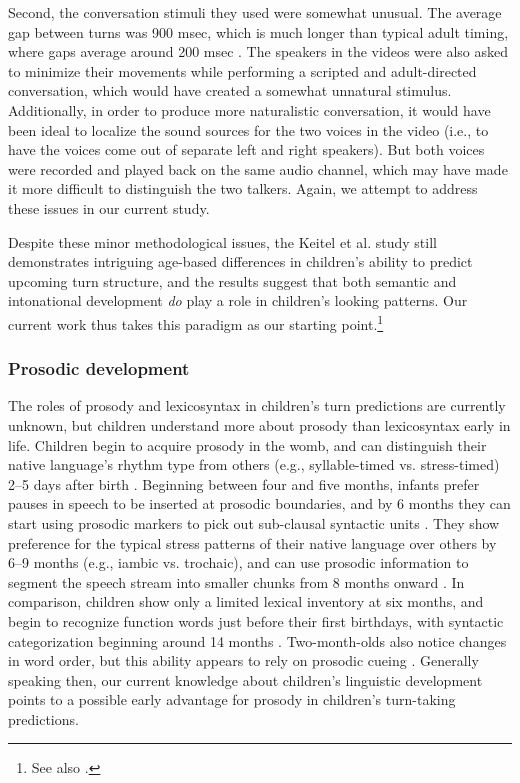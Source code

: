 \documentclass[authoryear, 12pt]{elsarticle}
\begin{document}
Second, the conversation stimuli they used were somewhat unusual. The average gap between turns was 900 msec, which is much longer than typical adult timing, where gaps average around 200 msec \citep{stivers2009}. The speakers in the videos were also asked to minimize their movements while performing a scripted and adult-directed conversation, which would have created a somewhat unnatural stimulus. Additionally, in order to produce more naturalistic conversation, it would have been ideal to localize the sound sources for the two voices in the video (i.e., to have the voices come out of separate left and right speakers). But both voices were recorded and played back on the same audio channel, which may have made it more difficult to distinguish the two talkers. Again, we attempt to address these issues in our current study. 

Despite these minor methodological issues, the Keitel et al. \citeyearpar{keitel2013} study still demonstrates intriguing age-based differences in children's ability to predict upcoming turn structure, and the results suggest that both semantic and intonational development \textit{do} play a role in children's looking patterns. Our current work thus takes this paradigm as our starting point.\footnote{See also \citet{casillas2012, casillas2013}.}

\subsubsection{Prosodic development}
The roles of prosody and lexicosyntax in children's turn predictions are currently unknown, but children understand more about prosody than lexicosyntax early in life. Children begin to acquire prosody in the womb, and can distinguish their native language's rhythm type from others (e.g., syllable-timed vs. stress-timed) 2--5 days after birth \citep{mehler1988, moon1993, nazzi2003}. Beginning between four and five months, infants prefer pauses in speech to be inserted at prosodic boundaries, and by 6 months they can start using prosodic markers to pick out sub-clausal syntactic units \citep{jusczyk1995, soderstrom2003}. They show preference for the typical stress patterns of their native language over others by 6--9 months (e.g., iambic vs. trochaic), and can use prosodic information to segment the speech stream into smaller chunks from 8 months onward \citep{johnson2001, jusczyk1993, morgan1995}. In comparison, children show only a limited lexical inventory at six months, and begin to recognize function words just before their first birthdays, with syntactic categorization beginning around 14 months \citep{bergelson2013, shi2010}. Two-month-olds also notice changes in word order, but this ability appears to rely on prosodic cueing \citep{mandel1996}. Generally speaking then, our current knowledge about children's linguistic development points to a possible early advantage for prosody in children's turn-taking predictions.
\end{document}

